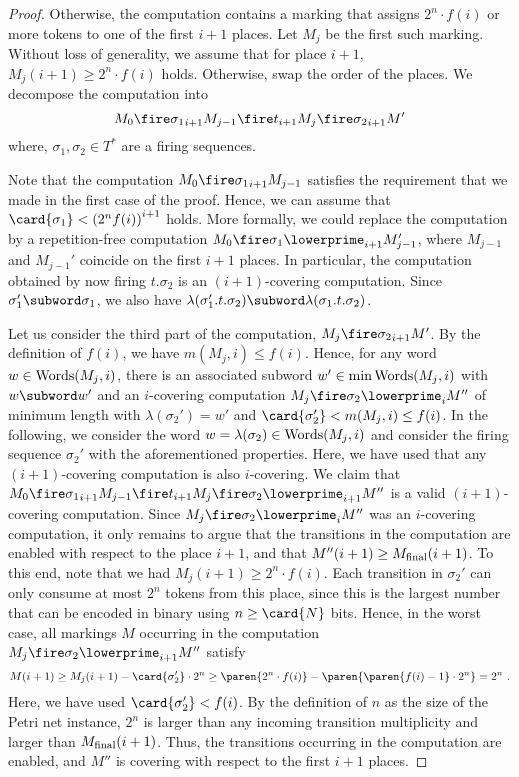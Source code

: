 \documentclass[../../diss.tex]{subfiles}
\begin{document}
\begin{proof}
    Otherwise, the computation contains a marking that assigns $2^n \cdot f(i)$ or more tokens to one of the first $i+1$ places.
    Let $M_j$ be the first such marking.
    Without loss of generality, we assume that for place $i+1$, $M_j(i+1) \geq 2^n \cdot f(i)$ holds.
    Otherwise, swap the order of the places.
    We decompose the computation into
    \[
        M_0 \fireipo{\sigma_1} M_{j-1} \fireipo{t} M_{j} \fireipo{\sigma_2} M'
    \]
    where, $\sigma_1, \sigma_2 \in T^*$ are a firing sequences.

    Note that the computation $M_0 \fireipo{\sigma_1} M_{j-1}$ satisfies the requirement that we made in the first case of the proof.
    Hence, we can assume that $\card{\sigma_1} < {(2^n f(i))}^{i+1}$ holds.
    More formally, we could replace the computation by a repetition-free computation $M_0 \fireipo{\sigma_1\lowerprime} M_{j-1}'$, where $M_{j-1}$ and $M_{j-1}'$ coincide on the first $i+1$ places.
    In particular, the computation obtained by now firing $t.\sigma_2$ is an $(i+1)$-covering computation.
    Since $\sigma_1' \subword \sigma_1$, we also have $\lambda(\sigma_1'.t.\sigma_2) \subword \lambda(\sigma_1.t.\sigma_2)$.

    Let us consider the third part of the computation, $M_{j} \fireipo{\sigma_2} M'$.
    By the definition of $f(i)$, we have $m(M_j,i) \leq f(i)$.
    Hence, for any word $w \in \text{Words}(M_j,i)$, there is an associated subword $w' \in \min \text{Words}(M_j,i)$ with $w \subword w'$ and an $i$-covering computation $M_j \firei{\sigma_2\lowerprime} M''$ of minimum length with $\lambda(\sigma_2') = w'$ and $\card{\sigma_2'} < m(M_j,i) \leq f(i)$.
    In the following, we consider the word $w = \lambda(\sigma_2) \in \text{Words}(M_j,i)$ and consider the firing sequence $\sigma_2'$ with the aforementioned properties.
    Here, we have used that any $(i+1)$-covering computation is also $i$-covering.
    We claim that $M_0 \fireipo{\sigma_1} M_{j-1} \fireipo{t} M_j \fireipo{\sigma_2\lowerprime} M''$ is a valid $(i+1)$-covering computation.
    Since $M_j \firei{\sigma_2\lowerprime} M''$ was an $i$-covering computation, it only remains to argue that the transitions in the computation are enabled with respect to the place $i+1$, and that $M''(i+1) \geq M_{\text{final}}(i+1)$.
    To this end, note that we had $M_j(i+1) \geq 2^n \cdot f(i)$.
    Each transition in $\sigma_2'$ can only consume at most $2^n$ tokens from this place, since this is the largest number that can be encoded in binary using $n \geq \card{N}$ bits.
    Hence, in the worst case, all markings $M$ occurring in the computation $M_j \fireipo{\sigma_2\lowerprime} M''$ satisfy
    \[
        M(i+1) \geq M_j(i+1) - \card{\sigma_2'} \cdot 2^n \geq \paren{2^n \cdot f(i)} - \paren{ \paren{f(i) - 1} \cdot 2^n}
        = 2^n
        \ .
    \]
    Here, we have used $\card{\sigma_2'} < f(i)$.
    By the definition of $n$ as the size of the Petri net instance, $2^n$ is larger than any incoming transition multiplicity and larger than $M_{\text{final}}(i+1)$.
    Thus, the transitions occurring in the computation are enabled, and $M''$ is covering with respect to the first $i+1$ places.


\end{proof}
\end{document}
